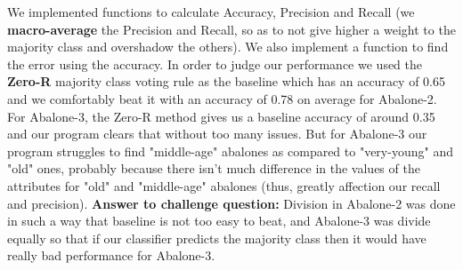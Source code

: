 We implemented functions to calculate Accuracy, Precision and Recall (we {\bf macro-average} the Precision and Recall, so as to not give higher a weight to the majority class and overshadow the others). We also implement a function to find the error using the accuracy. In order to judge our performance we used the {\bf Zero-R} majority class voting rule as the baseline which has an accuracy of 0.65 and we comfortably beat it with an accuracy of 0.78 on average for Abalone-2. For Abalone-3, the Zero-R method gives us a baseline accuracy of around 0.35 and our program clears that without too many issues. But for Abalone-3 our program struggles to find "middle-age" abalones as compared to "very-young" and "old" ones, probably because there isn't much difference in the values of the attributes for "old" and "middle-age" abalones (thus, greatly affection our recall and precision). {\bf Answer to challenge question:} Division in Abalone-2 was done in such a way that baseline is not too easy to beat, and Abalone-3 was divide equally so that if our classifier predicts the majority class then it would have really bad performance for Abalone-3. 

